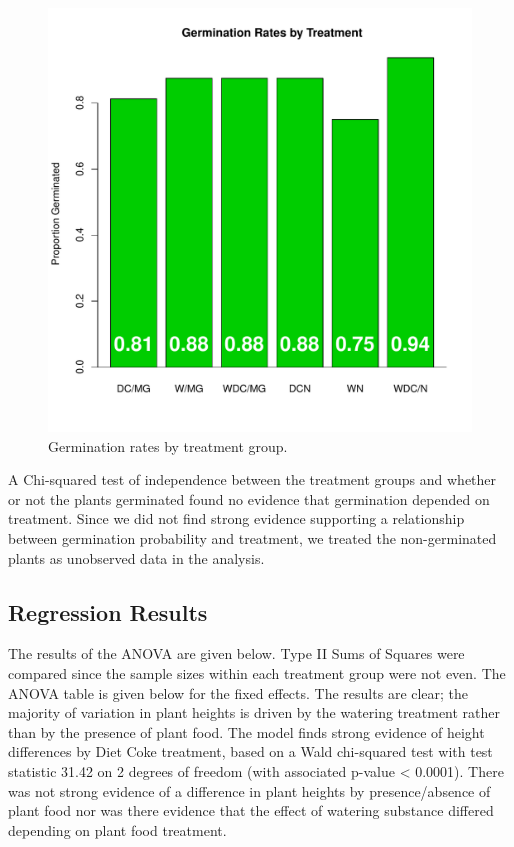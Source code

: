\documentclass[preprint,12pt]{elsarticle}\usepackage[]{graphicx}\usepackage[]{color}
\makeatletter
\def\maxwidth{ %
  \ifdim\Gin@nat@width>\linewidth
    \linewidth
  \else
    \Gin@nat@width
  \fi
}
\newenvironment{knitrout}{}{} %
\makeatother
\begin{document}
\begin{knitrout}
\color{fgcolor}\begin{figure}
\includegraphics[width=\maxwidth]{figure/germination_rates-1} \caption[Germination rates by treatment group]{Germination rates by treatment group.}\label{fig:germination_rates}
\end{figure}


\end{knitrout}

A Chi-squared test of independence between the treatment groups and whether or not the plants germinated found no evidence that germination depended on treatment.  Since we did not find strong evidence supporting a relationship between germination probability and treatment, we treated the non-germinated plants as unobserved data in the analysis. 



\subsection{Regression Results}

The results of the ANOVA are given below. Type II Sums of Squares were compared since the sample sizes within each treatment group were not even. The ANOVA table is given below for the fixed effects. The results are clear; the majority of variation in plant heights is driven by the watering treatment rather than by the presence of plant food.  The model finds strong evidence of height differences by Diet Coke treatment, based on a Wald chi-squared test with test statistic 31.42 on 2 degrees of freedom (with associated p-value < 0.0001). There was not strong evidence of a difference in plant heights by presence/absence of plant food nor was there evidence that the effect of watering substance differed depending on plant food treatment. 
\end{document}
